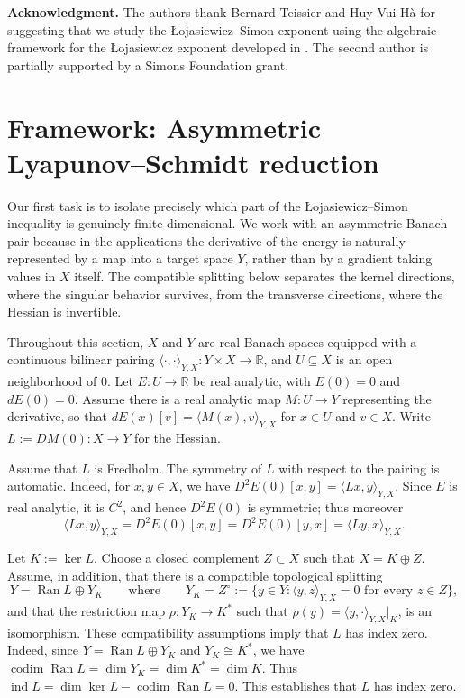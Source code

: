 \documentclass[11pt]{article}
\theoremstyle{definition}
\theoremstyle{remark}
\begin{document}
\medskip

\noindent\textbf{Acknowledgment.} The authors thank Bernard Teissier and Huy Vui H\`a for suggesting that we study the \L{}ojasiewicz--Simon exponent using the algebraic framework for the \L{}ojasiewicz exponent developed in \cite{Ha2026}. The second author is partially supported by a Simons Foundation grant.

\section{Framework: Asymmetric Lyapunov--Schmidt reduction}\label{sec:framework}

Our first task is to isolate precisely which part of the Łojasiewicz--Simon inequality is genuinely finite dimensional. We work with an asymmetric Banach pair because in the applications the derivative of the energy is naturally represented by a map into a target space $Y$, rather than by a gradient taking values in $X$ itself. The compatible splitting below separates the kernel directions, where the singular behavior survives, from the transverse directions, where the Hessian is invertible.

Throughout this section, $X$ and $Y$ are real Banach spaces equipped with a continuous bilinear pairing $\langle\cdot,\cdot\rangle_{Y,X}:Y\times X\to\mathbb R$, and $U\subseteq X$ is an open neighborhood of $0$. Let $E:U\to\mathbb R$ be real analytic, with $E(0)=0$ and $dE(0)=0$. Assume there is a real analytic map $M:U\to Y$ representing the derivative, so that $dE(x)[v]=\langle M(x),v\rangle_{Y,X}$ for $x\in U$ and $v\in X$. Write $L:=DM(0):X\to Y$ for the Hessian.


\smallskip
Assume that $L$ is Fredholm. The symmetry of $L$ with respect to the pairing is automatic. Indeed, for $x,y\in X$, we have
$D^2E(0)[x,y]=\langle Lx,y\rangle_{Y,X}.$ 
Since $E$ is real analytic, it is $C^2$, and hence $D^2E(0)$ is symmetric;  thus moreover
$$\langle Lx,y\rangle_{Y,X}=D^2E(0)[x,y]=D^2E(0)[y,x]=\langle Ly,x\rangle_{Y,X}.$$

Let $K:=\ker L$. Choose a closed complement $Z\subset X$ such that $X=K\oplus Z$.
Assume, in addition, that there is a compatible topological splitting
$$Y=\operatorname{Ran}L\oplus Y_K \qquad \text{where} \qquad
Y_K=Z^\circ :=\{y\in Y:\langle y,z\rangle_{Y,X}=0 \text{ for every }z\in Z\}, $$
and that the restriction map
$\rho:Y_K\longrightarrow K^*$ such that $\rho(y)=\langle y,\cdot\rangle_{Y,X}\big|_K$,
is an isomorphism.
These compatibility assumptions imply that $L$ has index zero. Indeed,
since $Y = \operatorname{Ran} L \oplus Y_K$ and $Y_K \cong K^*$, we have
$\operatorname{codim} \operatorname{Ran} L = \dim Y_K = \dim K^* = \dim K$.
Thus $\operatorname{ind}L=\dim\ker L-\operatorname{codim}\operatorname{Ran}L=0$. This establishes that $L$ has index zero.
\end{document}

